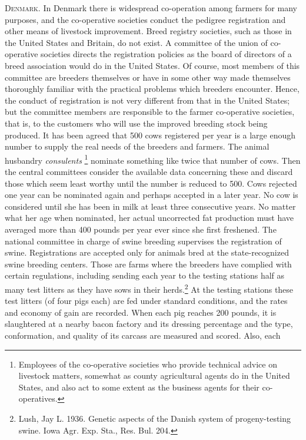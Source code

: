 \textsc{Denmark}. In Denmark there is widespread co-operation among
farmers for many purposes, and the co-operative societies conduct the
pedigree registration and other means of livestock improvement. Breed
registry societies, such as those in the United States and Britain, do not
exist. A committee of the union of co-operative societies directs the registration
policies as the board of directors of a breed association would
do in the United States. Of course, most members of this committee are
breeders themselves or have in some other way made themselves thoroughly
familiar with the practical problems which breeders encounter.
Hence, the conduct of registration is not very different from that in the
United States; but the committee members are responsible to the farmer
co-operative societies, that is, to the customers who will use the
improved breeding stock being produced. It has been agreed that 500
cows registered per year is a large enough number to supply the real
needs of the breeders and farmers. The animal husbandry \textit{consulents}
\footnote{Employees of the co-operative societies who provide technical
advice on livestock matters, somewhat as county agricultural agents do in
the United States, and also act to some extent as the business agents for
their co-operatives.}
nominate something like twice that number of cows. Then the central
committees consider the available data concerning these and discard
those which seem least worthy until the number is reduced to 500. Cows
rejected one year can be nominated again and perhaps accepted in a
later year. No cow is considered until she has been in milk at least three
consecutive years. No matter what her age when nominated, her actual
uncorrected fat production must have averaged more than 400 pounds
per year ever since she first freshened. The national committee in
charge of swine breeding supervises the registration of swine. Registrations
are accepted only for animals bred at the state-recognized swine
breeding centers. Those are farms where the breeders have complied
with certain regulations, including sending each year to the testing stations
half as many test litters as they have sows in their herds.\footnote{Lush,
Jay L. 1936. Genetic aspects of the Danish system of progeny-testing swine.
Iowa Agr. Exp. Sta., Res. Bul. 204.} At the testing stations these test litters
(of four pigs each) are fed under standard conditions, and the rates and
economy of gain are recorded. When each pig reaches 200 pounds, it is
slaughtered at a nearby bacon factory and its dressing percentage and the type,
conformation, and quality of its carcass are measured and scored. Also, each

